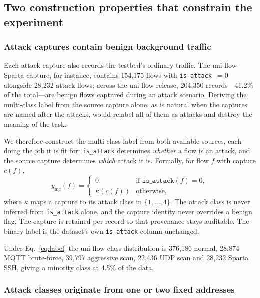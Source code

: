 \subsection{Two construction properties that constrain the experiment}

\subsubsection{Attack captures contain benign background traffic}

Each attack capture also records the testbed's ordinary traffic. The uni-flow
Sparta capture, for instance, contains 154{,}175 flows with
\texttt{is\_attack}~$=0$ alongside 28{,}232 attack flows; across the uni-flow
release, 204{,}350 records---41.2\% of the total---are benign flows captured
during an attack scenario. Deriving the multi-class label from the source
capture alone, as is natural when the captures are named after the attacks,
would relabel all of them as attacks and destroy the meaning of the task.

We therefore construct the multi-class label from both available sources, each
doing the job it is fit for: \texttt{is\_attack} determines \emph{whether} a
flow is an attack, and the source capture determines \emph{which} attack it is.
Formally, for flow $f$ with capture $c(f)$,
\begin{equation}
y_{\mathrm{mc}}(f) =
\begin{cases}
0 & \text{if } \texttt{is\_attack}(f) = 0,\\
\kappa(c(f)) & \text{otherwise,}
\end{cases}
\label{eq:label}
\end{equation}
where $\kappa$ maps a capture to its attack class in
$\{1,\dots,4\}$. The attack class is never inferred from \texttt{is\_attack}
alone, and the capture identity never overrides a benign flag. The capture is
retained per record so that provenance stays auditable. The binary label is the
dataset's own \texttt{is\_attack} column unchanged.

Under Eq.~\eqref{eq:label} the uni-flow class distribution is 376{,}186 normal,
28{,}874 MQTT brute-force, 39{,}797 aggressive scan, 22{,}436 UDP scan and
28{,}232 Sparta SSH, giving a minority class at 4.5\% of the data.

\subsubsection{Attack classes originate from one or two fixed addresses}

